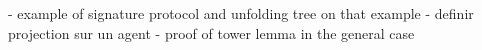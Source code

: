 - example of signature protocol and unfolding tree on that example
- definir projection sur un agent
- proof of tower lemma in the general case